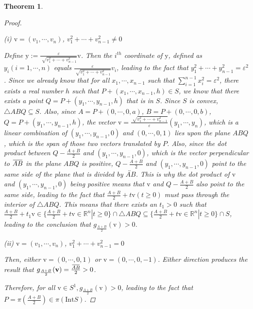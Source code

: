 \documentclass[a4paper]{article}
\newtheorem{thm}{Theorem}[subsection]
\newcommand{\overbar}[1]{\mkern 1.5mu\overline{\mkern-1.5mu#1\mkern-1.5mu}\mkern 1.5mu}
\theoremstyle{definition}
\begin{document}
\begin{thm}
\begin{proof}
\begin{flushleft}(i) $\boldsymbol{\mathrm{v}}=(v_1,\cdots,v_n)$, $v_1^2+\cdots+v_{n-1}^2\not=0$\end{flushleft}
Define $\boldsymbol{\mathrm{y}}:=\frac{\varepsilon}{\sqrt[]{v_1^2+\cdots+v_{n-1}^2}}\boldsymbol{\mathrm{v}}$. Then the $i^{th}$ coordinate of $\boldsymbol{\mathrm{y}}$, defined as $y_i(i=1,\cdots,n)$ equals $\frac{\varepsilon}{\sqrt[]{v_1^2+\cdots+v_{n-1}^2}}v_i$, leading to the fact that $y_1^2+\cdots+y_{n-1}^2=\varepsilon^2$. Since we already know that for all $  x_1,\cdots,x_{n-1}$ such that $\sum\limits_{i=1}^{n-1} x_i^2=\varepsilon^2$, there exists a real number $h$ such that $P+(x_1,\cdots,x_{n-1},h)\in S$, we know that there exists a point $Q=P+(y_1,\cdots,y_{n-1},h)$ that is in $S$. Since $S$ is convex, $\bigtriangleup ABQ\subseteq S$. Also, since $A=P+(0,\cdots,0,a)$, $B=P+(0,\cdots,0,b)$, $Q=P+(y_1,\cdots,y_{n-1},h)$, the vector $\boldsymbol{\mathrm{v}}=\frac{\sqrt[]{v_1^2+\cdots+v_{n-1}^2}}{\varepsilon}(y_1,\cdots,y_n)$, which is a linear combination of $(y_1,\cdots,y_{n-1},0)$ and $(0,\cdots,0,1)$ lies upon the plane $ABQ$, which is the span of those two vectors translated by $P$. Also, since the dot product between $Q-\frac{A+B}{2}$ and $(y_1,\cdots,y_{n-1}, 0)$, which is the vector perpendicular to $\overbar{AB}$ in the plane $ABQ$ is positive, $Q-\frac{A+B}{2}$ and $(y_1,\cdots,y_{n-1}, 0)$ point to the same side of the plane that is divided by $\overleftrightarrow{AB}$. This is why the dot product of $\boldsymbol{\mathrm{v}}$ and $(y_1,\cdots,y_{n-1}, 0)$ being positive means that $\boldsymbol{\mathrm{v}}$ and $Q-\frac{A+B}{2}$ also point to the same side, leading to the fact that $\frac{A+B}{2}+t\boldsymbol{\mathrm{v}}(t\ge0)$ must pass through the interior of $\bigtriangleup ABQ$. This means that there exists an $t_1>0$ such that $\frac{A+B}{2}+t_1\boldsymbol{\mathrm{v}}\in \{\frac{A+B}{2}+t\boldsymbol{\mathrm{v}}\in\mathbb{R}^n|t\ge0\}\cap\bigtriangleup ABQ\subseteq \{\frac{A+B}{2}+t\boldsymbol{\mathrm{v}}\in\mathbb{R}^n|t\ge0\}\cap S$, leading to the conclusion that $g_{\frac{A+B}{2}}(\boldsymbol{\mathrm{v}})>0$.


\begin{flushleft}(ii) $\boldsymbol{\mathrm{v}}=(v_1,\cdots,v_n)$, $v_1^2+\cdots+v_{n-1}^2=0$

Then, either $\boldsymbol{\mathrm{v}}=(0,\cdots,0,1)$ or $\boldsymbol{\mathrm{v}}=(0,\cdots,0,-1)$. Either direction produces the result that $g_{\frac{A+B}{2}}(\boldsymbol{\mathrm{v}})=\frac{\overbar{AB}}{2}>0$.
\end{flushleft}
Therefore, for all $ \boldsymbol{\mathrm{v}}\in S^1,g_{\frac{A+B}{2}}(\boldsymbol{\mathrm{v}})>0$, leading to the fact that $P=\pi(\frac{A+B}{2})\in \pi(\mathrm{Int}S)$.
\end{proof}
\end{thm}
\end{document}
